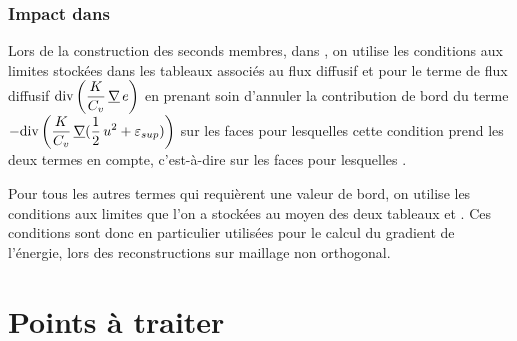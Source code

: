 \subsubsection*{Impact dans }

Lors de la construction des seconds membres, dans , on utilise les
conditions aux limites stock\'ees dans les tableaux associ\'es au flux
diffusif
 et
 pour le terme de flux diffusif
$\displaystyle\text{div}\,{\left(\frac{K}{C_v}\,\underline{\nabla}\,e\right)}$
en prenant soin d'annuler la contribution de bord du terme
$\displaystyle-\text{div}\,{\left(\frac{K}{C_v}\,\underline{\nabla}{(\frac{1}{2}\,u^2+\varepsilon_{sup})}\right)}$
sur les faces pour lesquelles cette condition
prend les deux termes en compte, c'est-\`a-dire sur les faces pour lesquelles
.

Pour tous les autres termes qui requi\`erent une valeur de bord, on utilise les
conditions aux limites que l'on a stock\'ees au moyen des deux tableaux
 et
. Ces conditions sont
donc en particulier utilis\'ees pour le calcul du gradient de l'\'energie,
lors des reconstructions sur maillage non orthogonal.


\newpage
\section*{Points \`a traiter}
\label{Cfbl_Cfxtcl_prg_a_traiter}%


